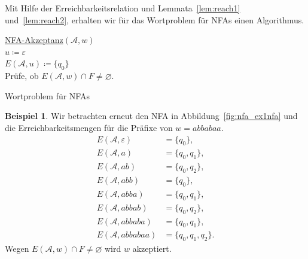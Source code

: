 \documentclass[11pt, a4paper]{article}
\theoremstyle{definition}
\newtheorem{example}[definition]{Beispiel}
\theoremstyle{plain}
\numberwithin{equation}{section}
\let\emptyset\varnothing
\begin{document}
Mit Hilfe der Erreichbarkeitsrelation und Lemmata~\ref{lem:reach1} und~\ref{lem:reach2}, erhalten wir für das Wortproblem für NFAs einen Algorithmus.
\begin{algorithm}
	\underline{NFA-Akzeptanz}{$(\mathcal{A}, w)$}\\
	$u \coloneqq \varepsilon$\\
	$E(\mathcal{A}, u) \coloneqq \{ q_0 \}$\\	
	Prüfe, ob $E(\mathcal{A}, w) \cap F \neq \emptyset$.
	\caption{Wortproblem für NFAs}
	\label{alg:nfaacc}
\end{algorithm}
\begin{example}
	Wir betrachten erneut den NFA in Abbildung~\ref{fig:nfa_ex1nfa} und die Erreichbarkeitsmengen für die Präfixe von $w = abbabaa$.
	\begin{align*}
		E(\mathcal{A}, \varepsilon) &= \{ q_0 \},\\
		E(\mathcal{A}, a) &= \{ q_0, q_1 \},\\
		E(\mathcal{A}, ab) &= \{ q_0, q_2 \},\\
		E(\mathcal{A}, abb) &= \{ q_0 \},\\
		E(\mathcal{A}, abba) &= \{ q_0, q_1 \},\\
		E(\mathcal{A}, abbab) &= \{ q_0, q_2 \},\\
		E(\mathcal{A}, abbaba) &= \{ q_0, q_1 \},\\
		E(\mathcal{A}, abbabaa) &= \{ q_0, q_1, q_2 \}.
	\end{align*}
	Wegen $E(\mathcal{A}, w) \cap F \neq \emptyset$ wird $w$ akzeptiert.
\end{example}
\end{document}
